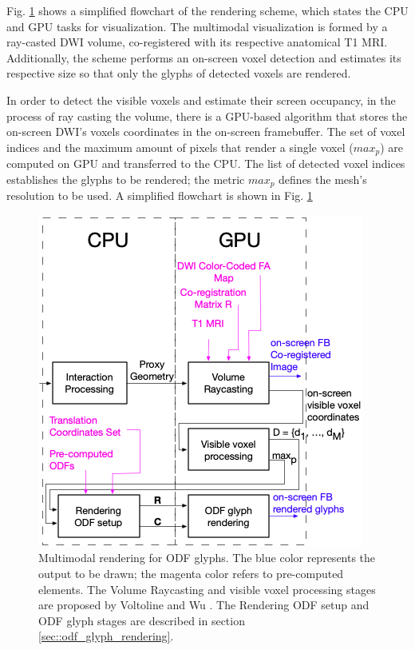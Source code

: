\documentclass[twoside,twocolumn,10pt]{article}
\begin{document}


Fig. \ref{fig::vmtk_simplified} shows a simplified flowchart of the rendering scheme, which states the CPU and GPU tasks for visualization. The multimodal visualization is formed by a ray-casted DWI volume, co-registered with its respective anatomical T1 MRI. Additionally, the scheme performs an on-screen voxel detection and estimates its respective size so that only the glyphs of detected voxels are rendered.

In order to detect the visible voxels and estimate their screen occupancy, in the process of ray casting the volume, there is a GPU-based algorithm that stores the on-screen DWI's voxels coordinates in the on-screen framebuffer. The set of voxel indices and the maximum amount of pixels that render a single voxel ($max_p$) are computed on GPU and transferred to the CPU. The list of detected voxel indices establishes the glyphs to be rendered; the metric $max_p$ defines the mesh's resolution to be used. A simplified flowchart is shown in Fig. \ref{fig::vmtk_simplified}

\begin{figure}[ht]
    \centering
    \includegraphics[width=1.0\linewidth, angle=0]{figs/rendering_scheme/fluxograma_glifosVMTK_2.png}
    \caption{Multimodal rendering for ODF glyphs. The blue color represents the output to be drawn; the magenta color refers to pre-computed elements. The Volume Raycasting and visible voxel processing stages are proposed by Voltoline and Wu \cite{voltoline2021}. The Rendering ODF setup and ODF glyph stages are described in section \ref{sec::odf_glyph_rendering}. }
    \label{fig::vmtk_simplified}
\end{figure}
\end{document}
